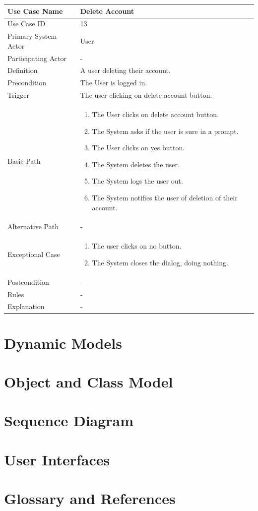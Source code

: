 \documentclass[a4paper,12pt]{report}
\begin{document}
		\begin{tabular}{|m{4cm}|m{11.5cm}|}
			\hline
				Use Case Name & Delete Account\\
			\hline
				Use Case ID & 13\\
			\hline
				Primary System Actor & User\\
			\hline
				Participating Actor & -\\
			\hline
				Definition & A user deleting their account.\\
			\hline
				Precondition & The User is logged in.\\
			\hline
				Trigger & The user clicking on delete account button.\\
			\hline
				Basic Path & \begin{enumerate}
					\item The User clicks on delete account button.
					\item The System asks if the user is sure in a prompt.
					\item The User clicks on yes button.
					\item The System deletes the user.
					\item The System logs the user out.
					\item The System notifies the user of deletion of their account.
				\end{enumerate}		
				\\
			\hline
				Alternative Path & -\\
			\hline
				Exceptional Case & \begin{enumerate}
					\item The user clicks on no button.
					\item The System closes the dialog, doing nothing.
				\end{enumerate}
				\\
			\hline
				Postcondition & -\\
			\hline
				Rules & -\\
			\hline
				Explanation & -\\
			\hline
		\end{tabular}
	\section{Dynamic Models}
	\section{Object and Class Model}
	\section{Sequence Diagram}
	\section{User Interfaces}
	\section{Glossary and References}
\end{document}
